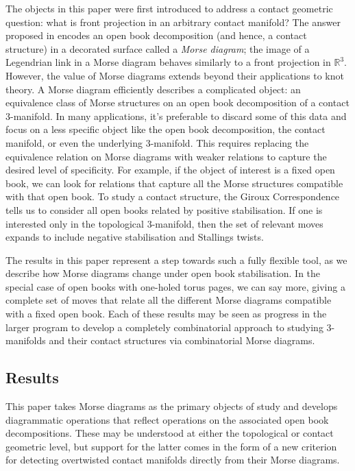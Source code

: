 \documentclass{amsart}
\theoremstyle{definition}
\begin{document}
The objects in this paper were first introduced to address a contact geometric question: what is front projection in an arbitrary contact manifold?  The answer proposed in \cite{GL} encodes an open book decomposition (and hence, a contact structure) in a decorated surface called a \textit{Morse diagram}; the image of a Legendrian link in a Morse diagram behaves similarly to a front projection in $\mathbb{R}^3$.  However, the value of Morse diagrams extends beyond their applications to knot theory.  A Morse diagram efficiently describes a complicated object: an equivalence class of Morse structures on an open book decomposition of a contact $3$-manifold.  In many applications, it's preferable to discard some of this data and focus on a less specific object like the open book decomposition, the contact manifold, or even the underlying $3$-manifold.  This requires replacing the equivalence relation on Morse diagrams with weaker relations to capture the desired level of specificity.   For example, if the object of interest is  a fixed open book, we can look for relations that capture all the Morse structures compatible with that open book.  To study a contact structure, the Giroux Correspondence tells us to consider all open books related by positive stabilisation. If one is interested only in the topological 3-manifold, then the set of relevant moves expands to include negative stabilisation and Stallings twists.

The results in this paper represent a step towards such a fully flexible tool, as we describe how Morse diagrams change under open book stabilisation.  In the special case of open books with one-holed torus pages, we can say more, giving a complete set of moves that relate all the different Morse diagrams compatible with a fixed open book.  Each of these results may be seen as progress in the larger program to develop a completely combinatorial approach to studying 3-manifolds and their contact structures via combinatorial Morse diagrams.  







\subsection{Results}
This paper takes  Morse diagrams as the primary objects of study and develops diagrammatic operations that reflect operations on the associated open book decompositions.  These may be understood at either the topological or contact geometric level, but support for the latter comes in the form of a new criterion for detecting overtwisted contact manifolds directly from their Morse diagrams.  
\end{document}
